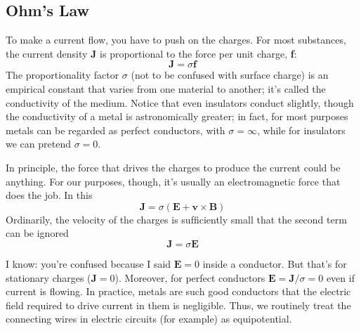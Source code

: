 \documentclass[../../../main.tex]{subfiles}
\begin{document}
\subsection*{Ohm's Law}
To make a current ﬂow, you have to push on the charges. For most substances, the current density \textbf{J} is proportional to the force per unit charge, \textbf{f}:
\begin{equation*}
    \mathbf{J} = \sigma \mathbf{f}
\end{equation*}
The proportionality factor $\sigma$ (not to be confused with surface charge) is an empirical constant that varies from one material to another; it's called the conductivity of the medium.  Notice that even insulators conduct slightly, though the conductivity of a metal is astronomically greater; in fact, for most purposes metals can be regarded as perfect conductors, with $\sigma = \infty$, while for insulators 
we can pretend $\sigma = 0$.

In principle, the force that drives the charges to produce the current could be anything. For our purposes, though, it's usually an electromagnetic force that does the job. In this
\begin{equation*}
    \mathbf{J} = \sigma(\mathbf{E}+\mathbf{v}\times \mathbf{B})
\end{equation*}
Ordinarily, the velocity of the charges is sufﬁciently small that the second term can be ignored
\begin{equation*}
    \mathbf{J} = \sigma\mathbf{E}
\end{equation*}

I know: you're confused because I said $\mathbf{E} = 0$ inside a conductor. But that's for stationary charges ($\mathbf{J} = 0$). Moreover, for perfect conductors $\mathbf{E} = \mathbf{J}/\sigma = 0$ even if current is ﬂowing. In practice, metals are such good conductors that the electric ﬁeld required to drive current in them is negligible. Thus, we routinely treat the connecting wires in electric circuits (for example) as equipotential.
\end{document}
